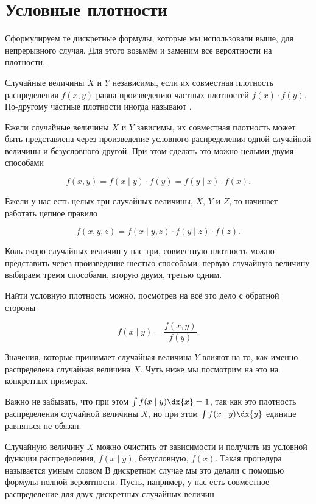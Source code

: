 \documentclass[12pt, a4paper, oneside]{article}
\begin{document}
\section{Условные плотности}


Сформулируем те дискретные формулы, которые мы использовали выше, для непрерывного случая. Для этого возьмём и заменим все вероятности на плотности.

Случайные величины $X$ и $Y$ независимы, если их совместная плотность распределения $f(x,y)$ равна произведению частных плотностей $f(x) \cdot f(y)$. По-другому частные плотности иногда называют .

Ежели случайные величины $X$ и $Y$ зависимы, их совместная плотность может быть представлена через произведение условного распределения одной случайной величины и безусловного другой. При этом сделать это можно целыми двумя способами

\begin{equation}\label{f1}
 f(x,y) = f(x \mid y) \cdot f(y) = f(y \mid x) \cdot f(x).
\end{equation}

Ежели у нас есть целых три случайных величины, $X$, $Y$ и $Z$, то начинает работать цепное правило

\[ f(x,y,z) = f(x \mid y,z) \cdot f(y \mid z) \cdot f(z).\]

Коль скоро случайных величин у нас три, совместную плотность можно представить через произведение шестью способами: первую случайную величину выбираем тремя способами, вторую двумя, третью одним.

Найти условную плотность можно, посмотрев на всё это дело с обратной стороны

\begin{equation}\label{f2}
f(x \mid y)  =  \frac{f(x,y)}{f(y)}.
\end{equation}

Значения, которые принимает случайная величина $Y$ влияют на то, как именно распределена случайная величина $X$. Чуть ниже мы посмотрим на это на конкретных примерах. 

Важно не забывать, что при этом $\int f(x \mid y) \dx{x} = 1$, так как это плотность распределения случайной величины $X$, но при этом $\int f(x \mid y) \dx{y}$ единице равняться не обязан.

Случайную величину $X$ можно очистить от зависимости  и получить из условной функции распределения, $f(x \mid y)$, безусловную, $f(x)$.  Такая процедура называется умным словом  В дискретном случае мы это делали с помощью формулы полной вероятности. Пусть, например, у нас есть совместное распределение для двух дискретных случайных величин
\end{document}

